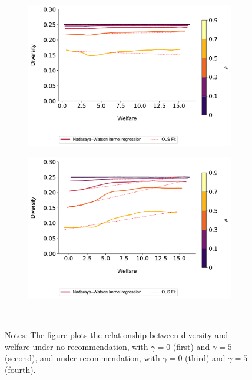 \documentclass[manuscript, nonacm]{acmart}
\begin{document}
\begin{figure}[t]
\begin{minipage}{1.2\textwidth}
\begin{subfigure}{.23\textwidth}
\includegraphics[width=1.0\linewidth]{figures/diversity_welfare_rn_partial_n_200.pdf}
\end{subfigure}
\begin{subfigure}{.23\textwidth}
\includegraphics[width=1.0\linewidth]{figures/diversity_welfare_ra_partial_n_200.pdf}
\end{subfigure}
\end{minipage}\\
\caption*{\scriptsize Notes: The figure plots the relationship between diversity and welfare under no recommendation, with $\gamma = 0$ (first) and $\gamma = 5$ (second), and under recommendation, with $\gamma = 0$ (third) and $\gamma = 5$ (fourth).}\label{fig:diversity_welfare_ra}
\end{figure}
\addtocounter{figure}{-1}
\end{document}
